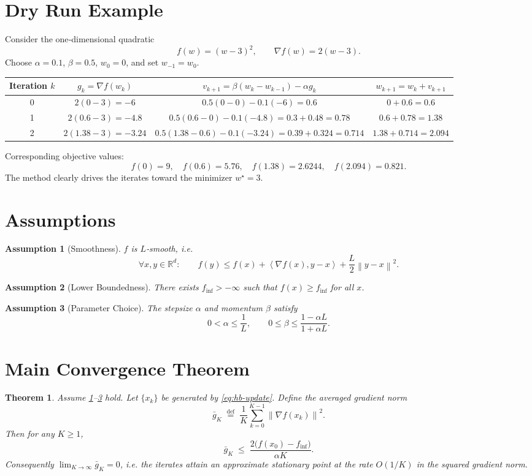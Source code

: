 \documentclass{article}
\newtheorem{theorem}{Theorem}
\newtheorem{assumption}{Assumption}
\newcommand{\norm}[1]{\left\|#1\right\|}
\newcommand{\ip}[2]{\left\langle #1,#2\right\rangle}
\newcommand{\grad}{\nabla}
\begin{document}
\section*{Dry Run Example}
Consider the one‑dimensional quadratic
\[
    f(w) = (w-3)^{2}, \qquad \grad f(w)=2(w-3).
\]
Choose $\alpha=0.1$, $\beta=0.5$, $w_{0}=0$, and set $w_{-1}=w_{0}$.

\begin{center}
\begin{tabular}{c|c|c|c}
Iteration $k$ & $g_{k}= \grad f(w_{k})$ & $v_{k+1}= \beta (w_{k}-w_{k-1})-\alpha g_{k}$ & $w_{k+1}=w_{k}+v_{k+1}$ \\ \hline
0 & $2(0-3)=-6$ & $0.5(0-0)-0.1(-6)=0.6$ & $0+0.6=0.6$ \\
1 & $2(0.6-3)=-4.8$ & $0.5(0.6-0)-0.1(-4.8)=0.3+0.48=0.78$ & $0.6+0.78=1.38$ \\
2 & $2(1.38-3)=-3.24$ & $0.5(1.38-0.6)-0.1(-3.24)=0.39+0.324=0.714$ & $1.38+0.714=2.094$
\end{tabular}
\end{center}

Corresponding objective values:
\[
f(0)=9,\quad f(0.6)=5.76,\quad f(1.38)=2.6244,\quad f(2.094)=0.821.
\]
The method clearly drives the iterates toward the minimizer $w^{\star}=3$.

\newpage
\section*{Assumptions}
\begin{assumption}[Smoothness]\label{as:smooth}
$f$ is $L$‑smooth, i.e.
\[
    \forall x,y\in\mathbb{R}^{d}:\qquad 
    f(y)\le f(x)+\ip{\grad f(x)}{y-x}+\frac{L}{2}\norm{y-x}^{2}.
\]
\end{assumption}
\begin{assumption}[Lower Boundedness]\label{as:lb}
There exists $f_{\inf}>-\infty$ such that $f(x)\ge f_{\inf}$ for all $x$.
\end{assumption}
\begin{assumption}[Parameter Choice]\label{as:params}
The stepsize $\alpha$ and momentum $\beta$ satisfy
\[
    0<\alpha\le \frac{1}{L},\qquad
    0\le \beta \le \frac{1-\alpha L}{1+\alpha L}.
\tag{A3}
\]
\end{assumption}

\section*{Main Convergence Theorem}
\begin{theorem}\label{thm:hb-conv}
Assume \ref{as:smooth}–\ref{as:params} hold. Let $\{x_{k}\}$ be generated by \eqref{eq:hb-update}.  
Define the averaged gradient norm
\[
    \bar{g}_{K}\; \stackrel{\text{def}}{=}\; \frac{1}{K}\sum_{k=0}^{K-1}\norm{\grad f(x_{k})}^{2}.
\]
Then for any $K\ge 1$,
\[
    \bar{g}_{K}\;\le\;
    \frac{2\bigl(f(x_{0})-f_{\inf}\bigr)}{\alpha K}.
    \tag{T1}
\]
Consequently $\displaystyle\lim_{K\to\infty}\bar{g}_{K}=0$, i.e. the iterates attain an \emph{approximate stationary point} at the rate $O(1/K)$ in the squared gradient norm.
\end{theorem}
\end{document}

